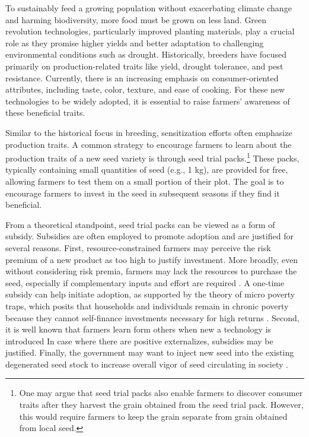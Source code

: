\documentclass[english]{article}\usepackage[]{graphicx}\usepackage[]{xcolor}
\begin{document}
To sustainably feed a growing population without exacerbating climate
change and harming biodiversity, more food must be grown on less land.
Green revolution technologies, particularly improved planting materials,
play a crucial role as they promise higher yields and better adaptation
to challenging environmental conditions such as drought. Historically,
breeders have focused primarily on production-related traits like
yield, drought tolerance, and pest resistance. Currently, there is
an increasing emphasis on consumer-oriented attributes, including
taste, color, texture, and ease of cooking. For these new technologies
to be widely adopted, it is essential to raise farmers' awareness
of these beneficial traits.

Similar to the historical focus in breeding, sensitization efforts
often emphasize production traits. A common strategy to encourage
farmers to learn about the production traits of a new seed variety
is through seed trial packs.\footnote{One may argue that seed trial packs also enable farmers to discover
consumer traits after they harvest the grain obtained from the seed
trial pack. However, this would require farmers to keep the grain
separate from grain obtained from local seed.} These packs, typically containing small quantities of seed (e.g.,
1 kg), are provided for free, allowing farmers to test them on a small
portion of their plot. The goal is to encourage farmers to invest
in the seed in subsequent seasons if they find it beneficial.

From a theoretical standpoint, seed trial packs can be viewed as a
form of subsidy. Subsidies are often employed to promote adoption
and are justified for several reasons. First, resource-constrained
farmers may perceive the risk premium of a new product as too high
to justify investment. More broadly, even without considering risk
premia, farmers may lack the resources to purchase the seed, especially
if complementary inputs and effort are required \citep[see][]{miehe2023miracle}.
A one-time subsidy can help initiate adoption, as supported by the
theory of micro poverty traps, which posits that households and individuals
remain in chronic poverty because they cannot self-finance investments
necessary for high returns \citep{barrett2006fractal}. Second, it
is well known that farmers learn form others when new a technology
is introduced \citep{10.1257/aer.100.1.35,campenhout2021role} In
case where there are positive externalizes, subsidies may be justified.
Finally, the government may want to inject new seed into the existing
degenerated seed stock to increase overall vigor of seed circulating
in society \citep{mcguire2016seed}.
\end{document}
